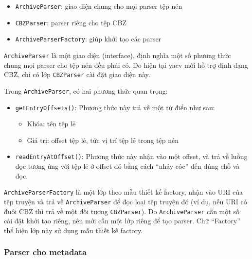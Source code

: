 \documentclass[../../../../thesis]{subfiles}
\begin{document}
\begin{itemize}
    \item
        \texttt{ArchiveParser}: giao diện chung cho mọi parser tệp nén
    \item
        \texttt{CBZParser}: parser riêng cho tệp CBZ
    \item
        \texttt{ArchiveParserFactory}: giúp khởi tạo các parser
\end{itemize}

\texttt{ArchiveParser} là một giao diện (interface), định nghĩa một số phương
thức chung mọi parser cho tệp nén đều phải có. Do hiện tại yacv mới hỗ trợ định
dạng CBZ, chỉ có lớp \texttt{CBZParser} cài đặt giao diện này.

Trong \texttt{ArchiveParser}, có hai phương thức quan trọng:

\begin{itemize}
    \item
        \texttt{getEntryOffsets()}: Phương thức này trả về một từ điển như sau:

        \begin{itemize}
            \item
                Khóa: tên tệp lẻ
            \item
                Giá trị: offset tệp lẻ, tức vị trí tệp lẻ trong tệp nén
        \end{itemize}
    \item
        \texttt{readEntryAtOffset()}: Phương thức này nhận vào một offset, và
        trả về luồng đọc tương ứng với tệp lẻ ở offset đó bằng cách ``nhảy cóc''
        đến đúng chỗ và đọc.
\end{itemize}

\texttt{ArchiveParserFactory} là một lớp theo mẫu thiết kế factory, nhận
vào URI của tệp truyện và trả về \texttt{ArchiveParser} để đọc loại tệp truyện
đó (ví dụ, nếu URI có đuôi CBZ thì trả về một đối tượng \texttt{CBZParser}). Do
\texttt{ArchiveParser} cần một số cài đặt khởi tạo riêng, nên mới cần một lớp
riêng để tạo parser. Chữ ``Factory'' thể hiện lớp này sử dụng mẫu thiết kế
factory.



\subsubsection{Parser cho metadata}
\end{document}
